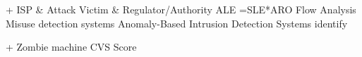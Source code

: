 + ISP & Attack Victim & Regulator/Authority
    ALE =SLE*ARO
    Flow Analysis
    Misuse detection systems
    Anomaly-Based Intrusion Detection Systems identify

+ Zombie machine
    CVS Score
